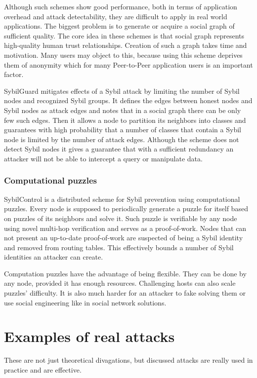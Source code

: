   Although such schemes show good performance, both in terms of application
  overhead and attack detectability, they are difficult to apply in real world
  applications. The biggest problem is to generate or acquire a social graph of
  sufficient quality. The core idea in these schemes is that social graph
  represents high-quality human trust relationships. Creation of such a graph
  takes time and motivation. Many users may object to this, because using this
  scheme deprives them of anonymity which for many Peer-to-Peer application
  users is an important factor.

  SybilGuard \cite{hai06} mitigates effects of a Sybil attack by limiting the
  number of Sybil nodes and recognized Sybil groups. It defines the edges
  between honest nodes and Sybil nodes as attack edges and notes that in a
  social graph there can be only few such edges. Then it allows a node to
  partition its neighbors into classes and guarantees with high probability
  that a number of classes that contain a Sybil node is limited by the number of
  attack edges. Although the scheme does not detect Sybil nodes it gives a
  guarantee that with a sufficient redundancy an attacker will not be able to
  intercept a query or manipulate data.

  \subsubsection{Computational puzzles}
  SybilControl\cite{li12} is a distributed scheme for Sybil prevention using
  computational puzzles. Every node is supposed to periodically generate a
  puzzle for itself based on puzzles of its neighbors and solve it. Such puzzle
  is verifiable by any node using novel multi-hop verification and serves as a
  proof-of-work. Nodes that can not present an up-to-date proof-of-work are
  suspected of being a Sybil identity and removed from routing tables. This
  effectively bounds a number of Sybil identities an attacker can create.

  Computation puzzles have the advantage of being flexible. They can be done by
  any node, provided it has enough resources. Challenging hosts can also scale
  puzzles' difficulty. It is also much harder for an attacker to fake
  solving them or use social engineering like in social network solutions.

\section{Examples of real attacks}
\label{sec:attack_examples}
These are not just theoretical divagations, but discussed attacks are really
used in practice and are effective.

